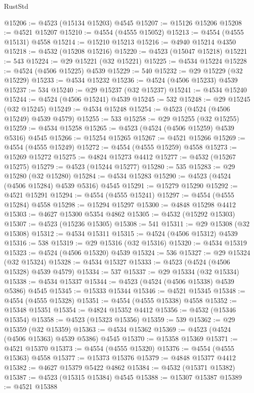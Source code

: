 \begin{lexlean}{RustStd}
\begin{coremodule}
@15206 := @4523 (@15134 @15203) @4545
@15207 := @15126 @15206
@15208 := @4521 @15207
@15210 := @4554 (@4555 @15052)
@15213 := @4554 (@4555 @15131) @4558
@15214 := @15210 @15213
@15216 := @4940 @15214 @4350
@15218 := @4532 (@15208 @15216)
@15220 := @4523 (@15047 @15218)
@15221 := 543
@15224 := @29 @15221 (@32 @15221)
@15225 := @4534 @15224
@15228 := @4524 (@4506 @15225) @4539
@15229 := 540
@15232 := @29 @15229 (@32 @15229)
@15233 := @4534 @15232
@15236 := @4524 (@4506 @15233) @4539
@15237 := 534
@15240 := @29 @15237 (@32 @15237)
@15241 := @4534 @15240
@15244 := @4524 (@4506 @15241) @4539
@15245 := 532
@15248 := @29 @15245 (@32 @15245)
@15249 := @4534 @15248
@15254 := @4523 (@4524 (@4506 @15249) @4539 @4579)
@15255 := 533
@15258 := @29 @15255 (@32 @15255)
@15259 := @4534 @15258
@15265 := @4523 (@4524 (@4506 @15259) @4539 @5316) @4545
@15266 := @15254 @15265
@15267 := @4521 @15266
@15269 := @4554 (@4555 @15249)
@15272 := @4554 (@4555 @15259) @4558
@15273 := @15269 @15272
@15275 := @4824 @15273 @4412
@15277 := @4532 (@15267 @15275)
@15279 := @4523 (@15244 @15277)
@15280 := 535
@15283 := @29 @15280 (@32 @15280)
@15284 := @4534 @15283
@15290 := @4523 (@4524 (@4506 @15284) @4539 @5316) @4545
@15291 := @15279 @15290
@15292 := @4521 @15291
@15294 := @4554 (@4555 @15241)
@15297 := @4554 (@4555 @15284) @4558
@15298 := @15294 @15297
@15300 := @4848 @15298 @4412
@15303 := @4627 @15300 @5354 @4862
@15305 := @4532 (@15292 @15303)
@15307 := @4523 (@15236 @15305)
@15308 := 541
@15311 := @29 @15308 (@32 @15308)
@15312 := @4534 @15311
@15315 := @4524 (@4506 @15312) @4539
@15316 := 538
@15319 := @29 @15316 (@32 @15316)
@15320 := @4534 @15319
@15323 := @4524 (@4506 @15320) @4539
@15324 := 536
@15327 := @29 @15324 (@32 @15324)
@15328 := @4534 @15327
@15333 := @4523 (@4524 (@4506 @15328) @4539 @4579)
@15334 := 537
@15337 := @29 @15334 (@32 @15334)
@15338 := @4534 @15337
@15344 := @4523 (@4524 (@4506 @15338) @4539 @5386) @4545
@15345 := @15333 @15344
@15346 := @4521 @15345
@15348 := @4554 (@4555 @15328)
@15351 := @4554 (@4555 @15338) @4558
@15352 := @15348 @15351
@15354 := @4824 @15352 @4412
@15356 := @4532 (@15346 @15354)
@15358 := @4523 (@15323 @15356)
@15359 := 539
@15362 := @29 @15359 (@32 @15359)
@15363 := @4534 @15362
@15369 := @4523 (@4524 (@4506 @15363) @4539 @5386) @4545
@15370 := @15358 @15369
@15371 := @4521 @15370
@15373 := @4554 (@4555 @15320)
@15376 := @4554 (@4555 @15363) @4558
@15377 := @15373 @15376
@15379 := @4848 @15377 @4412
@15382 := @4627 @15379 @5422 @4862
@15384 := @4532 (@15371 @15382)
@15387 := @4523 (@15315 @15384) @4545
@15388 := @15307 @15387
@15389 := @4521 @15388

\end{coremodule}
\end{lexlean}
